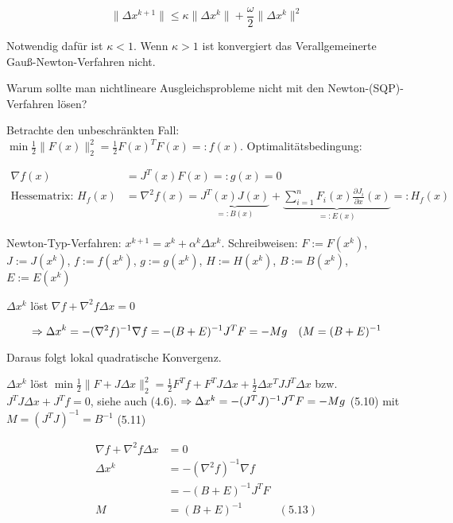 \[ \|\Delta x^{k+1}\| \leq \kappa \|\Delta x^k\| + \frac \omega 2 \| \Delta x^k\|^2 \]

Notwendig dafür ist $\kappa < 1$. Wenn $\kappa > 1$ ist konvergiert das Verallgemeinerte Gauß-Newton-Verfahren nicht.

Warum sollte man nichtlineare Ausgleichsprobleme nicht mit den Newton-(SQP)-Verfahren lösen?

Betrachte den unbeschränkten Fall: $\min \frac 12 \|F(x)\|_2^2 = \frac 12 F(x)^T F(x) =: f(x)$. Optimalitätsbedingung:

\begin{align*}
\nabla f(x) &= J^T(x) F(x) =: g(x) = 0 \\
\text{Hessematrix: } H_{f}(x) &= \nabla^2 f(x) = \underbrace{J^T(x) J(x)}_{=: B(x)} + \underbrace{ \sum\limits_{i=1}^n F_i(x) \frac{\partial J_i}{\partial x} (x) }_{=: E(x)} =: H_f(x)
\end{align*}

Newton-Typ-Verfahren: $x^{k+1} = x^k + \alpha^k \Delta x^k$. Schreibweisen: $F := F(x^k)$, $J := J(x^k)$, $f := f(x^k)$, $g := g(x^k)$, $H := H(x^k)$, $B := B(x^k)$, $E := E(x^k)$


$\Delta x^k$ löst $\nabla f + \nabla^2 f \Delta x = 0$

\[ \Rightarrow \Delta x^k = - (\nabla^2 f)^{-1} \nabla f = -(B+E)^{-1} J^T F = -Mg \quad (M = (B+E)^{-1} \]

Daraus folgt lokal quadratische Konvergenz.


$\Delta x^k$ löst $\min \frac 12 \| F + J \Delta x\|_2^2 = \frac 12 F^T f + F^T J \Delta x + \frac 12 \Delta x^T J J^T \Delta x$ bzw. $J^T J \Delta x + J^T f = 0$, siehe auch (4.6). $\Rightarrow \Delta x^k = -(J^T J)^{-1} J^T F = -Mg$ (5.10) mit $M = (J^T J)^{-1} = B^{-1}$ (5.11)


\begin{align*}
\nabla f + \nabla^2 f \Delta x &= 0 \\
\Delta x^k &= -(\nabla^2 f)^{-1} \nabla f \\
&= -(B+E)^{-1} J^T F \\
M &= (B+E)^{-1} & (5.13)
\end{align*}


